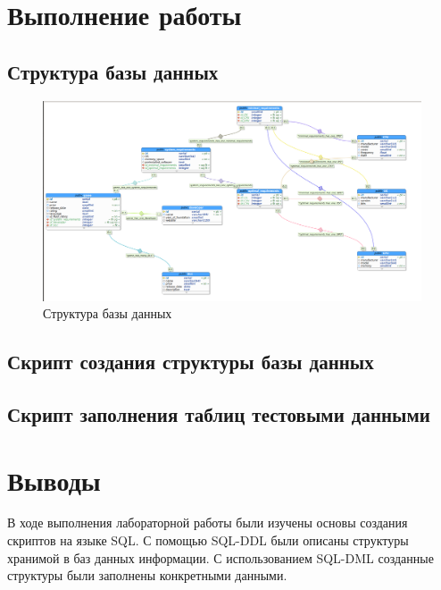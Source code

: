\section{Выполнение работы}

\subsection{Структура базы данных}

\begin{figure}[H]
	\centering
	\includegraphics[width=\linewidth]{../../lab1/pics/scheme}
	\caption{Структура базы данных}
\end{figure}

\subsection{Скрипт создания структуры базы данных}



\subsection{Скрипт заполнения таблиц тестовыми данными}




\section{Выводы}

В ходе выполнения лабораторной работы были изучены основы создания скриптов на языке SQL. С помощью SQL-DDL были описаны структуры хранимой в баз данных информации. С использованием SQL-DML созданные структуры были заполнены конкретными данными. 


